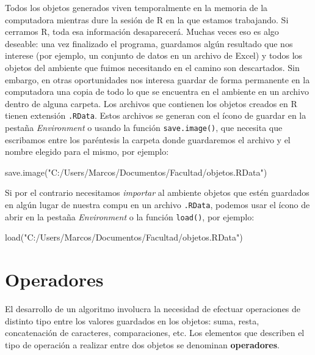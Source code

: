 \documentclass[
]{book}
\newenvironment{Shaded}{\begin{snugshade}}{\end{snugshade}}
\newcommand{\FunctionTok}[1]{\textcolor[rgb]{0.00,0.00,0.00}{#1}}
\newcommand{\NormalTok}[1]{#1}
\newcommand{\StringTok}[1]{\textcolor[rgb]{0.31,0.60,0.02}{#1}}
\begin{document}
Todos los objetos generados viven temporalmente en la memoria de la computadora mientras dure la sesión de R en la que estamos trabajando. Si cerramos R, toda esa información desaparecerá. Muchas veces eso es algo deseable: una vez finalizado el programa, guardamos algún resultado que nos interese (por ejemplo, un conjunto de datos en un archivo de Excel) y todos los objetos del ambiente que fuimos necesitando en el camino son descartados. Sin embargo, en otras oportunidades nos interesa guardar de forma permanente en la computadora una copia de todo lo que se encuentra en el ambiente en un archivo dentro de alguna carpeta. Los archivos que contienen los objetos creados en R tienen extensión \texttt{.RData}. Estos archivos se generan con el ícono de guardar en la pestaña \emph{Environment} o usando la función \texttt{save.image()}, que necesita que escribamos entre los paréntesis la carpeta donde guardaremos el archivo y el nombre elegido para el mismo, por ejemplo:

\begin{Shaded}
\begin{Highlighting}[]
\FunctionTok{save.image}\NormalTok{(}\StringTok{"C:/Users/Marcos/Documentos/Facultad/objetos.RData"}\NormalTok{)}
\end{Highlighting}
\end{Shaded}

Si por el contrario necesitamos \emph{importar} al ambiente objetos que estén guardados en algún lugar de nuestra compu en un archivo \texttt{.RData}, podemos usar el ícono de abrir en la pestaña \emph{Environment} o la función \texttt{load()}, por ejemplo:

\begin{Shaded}
\begin{Highlighting}[]
\FunctionTok{load}\NormalTok{(}\StringTok{"C:/Users/Marcos/Documentos/Facultad/objetos.RData"}\NormalTok{)}
\end{Highlighting}
\end{Shaded}

\hypertarget{operadores}{%
\section{Operadores}\label{operadores}}

El desarrollo de un algoritmo involucra la necesidad de efectuar operaciones de distinto tipo entre los valores guardados en los objetos: suma, resta, concatenación de caracteres, comparaciones, etc. Los elementos que describen el tipo de operación a realizar entre dos objetos se denominan \textbf{operadores}.
\end{document}
